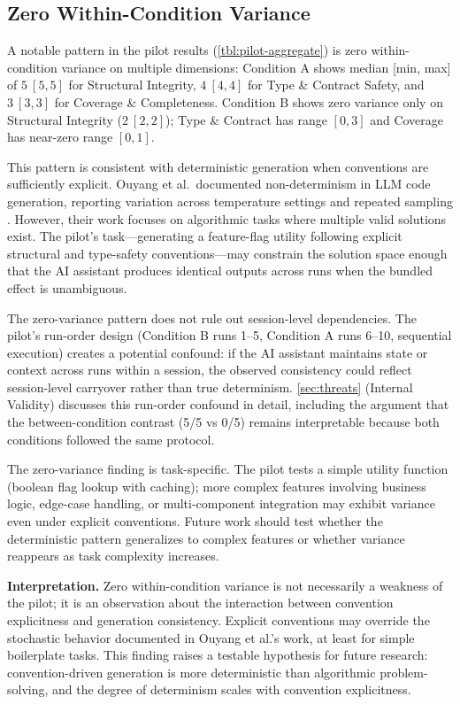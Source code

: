\documentclass[12pt,a4paper]{report}
\begin{document}
\subsection{Zero Within-Condition Variance}
\label{sec:zero-variance}

A notable pattern in the pilot results (\autoref{tbl:pilot-aggregate}) is zero within-condition variance on multiple dimensions: Condition A shows median [min, max] of $5\ [5, 5]$ for Structural Integrity, $4\ [4, 4]$ for Type \& Contract Safety, and $3\ [3, 3]$ for Coverage \& Completeness. Condition B shows zero variance only on Structural Integrity ($2\ [2, 2]$); Type \& Contract has range $[0, 3]$ and Coverage has near-zero range $[0, 1]$.

This pattern is consistent with deterministic generation when conventions are sufficiently explicit. Ouyang et al.\ documented non-determinism in LLM code generation, reporting variation across temperature settings and repeated sampling \parencite{ouyang2025nondeterminism}. However, their work focuses on algorithmic tasks where multiple valid solutions exist. The pilot's task---generating a feature-flag utility following explicit structural and type-safety conventions---may constrain the solution space enough that the AI assistant produces identical outputs across runs when the bundled effect is unambiguous.

The zero-variance pattern does not rule out session-level dependencies. The pilot's run-order design (Condition B runs 1--5, Condition A runs 6--10, sequential execution) creates a potential confound: if the AI assistant maintains state or context across runs within a session, the observed consistency could reflect session-level carryover rather than true determinism. \autoref{sec:threats} (Internal Validity) discusses this run-order confound in detail, including the argument that the between-condition contrast (5/5 vs 0/5) remains interpretable because both conditions followed the same protocol.

The zero-variance finding is task-specific. The pilot tests a simple utility function (boolean flag lookup with caching); more complex features involving business logic, edge-case handling, or multi-component integration may exhibit variance even under explicit conventions. Future work should test whether the deterministic pattern generalizes to complex features or whether variance reappears as task complexity increases.

\textbf{Interpretation.} Zero within-condition variance is not necessarily a weakness of the pilot; it is an observation about the interaction between convention explicitness and generation consistency. Explicit conventions may override the stochastic behavior documented in Ouyang et al.'s work, at least for simple boilerplate tasks. This finding raises a testable hypothesis for future research: convention-driven generation is more deterministic than algorithmic problem-solving, and the degree of determinism scales with convention explicitness.
\end{document}
